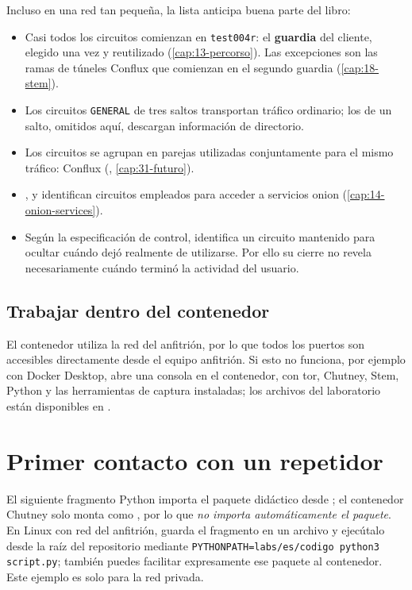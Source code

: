 Incluso en una red tan pequeña, la lista anticipa buena parte del libro:
\begin{itemize}
  \item Casi todos los circuitos comienzan en \texttt{test004r}: el \textbf{guardia} del cliente, elegido una vez y reutilizado (\cref{cap:13-percorso}). Las excepciones son las ramas de túneles Conflux que comienzan en el segundo guardia (\cref{cap:18-stem}).
  \item Los circuitos \texttt{GENERAL} de tres saltos transportan tráfico ordinario; los de un salto, omitidos aquí, descargan información de directorio.
  \item Los circuitos  se agrupan en parejas utilizadas conjuntamente para el mismo tráfico: Conflux (, \cref{cap:31-futuro}).
  \item {},  y  identifican circuitos empleados para acceder a servicios onion (\cref{cap:14-onion-services}).
  \item Según la especificación de control,  identifica un circuito mantenido para ocultar cuándo dejó realmente de utilizarse. Por ello su cierre no revela necesariamente cuándo terminó la actividad del usuario.
\end{itemize}

\subsection{Trabajar dentro del contenedor}\label{sec:rp-shell}

El contenedor utiliza la red del anfitrión, por lo que todos los puertos son accesibles directamente desde el equipo anfitrión. Si esto no funciona, por ejemplo con Docker Desktop,  abre una consola en el contenedor, con tor, Chutney, Stem, Python y las herramientas de captura instaladas; los archivos del laboratorio están disponibles en .

\section{Primer contacto con un repetidor}\label{sec:rp-contatto}

El siguiente fragmento Python importa el paquete didáctico  desde ; el contenedor Chutney solo monta  como , por lo que \emph{no importa automáticamente el paquete}. En Linux con red del anfitrión, guarda el fragmento en un archivo y ejecútalo desde la raíz del repositorio mediante \texttt{PYTHONPATH=labs/es/codigo python3 script.py}; también puedes facilitar expresamente ese paquete al contenedor. Este ejemplo es solo para la red privada.

